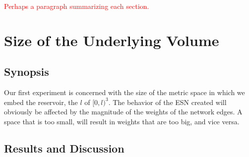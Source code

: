 \textcolor{red}{
  Perhaps a paragraph summarizing each section.
}

\section{Size of the Underlying Volume}
\label{sec:volume-size}

\subsection{Synopsis}

Our first experiment is concerned with the size of the metric space in which we
embed the reservoir, the $l$ of $[0, l)^3$. The behavior of the ESN created will
obviously be affected by the magnitude of the weights of the network edges. A
space that is too small, will result in weights that are too big, and vice
versa.

\subsection{Results and Discussion}


